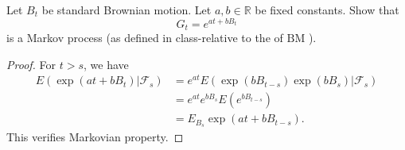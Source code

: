 \begin{problem}
	Let $B_t$ be standard Brownian motion. Let $a, b \in \mathbb{R}$ be fixed constants. Show that
\[
G_t=e^{a t+b B_t}
\]
is a Markov process (as defined in class-relative to the of $\mathrm{BM}$ ).
\end{problem}
\begin{proof}
	For $t > s$, we have
	\begin{align*}
		E\left( \exp\left( a t + b B_t \right) | \mathcal{F}_s \right) 
		&= e^{at } E\left( \exp\left( b B_{t - s} \right) \exp\left( b B_s \right) | \mathcal{F}_s \right)  \\
		&= e^{at } e^{b B_s} E\left( e^{b B_{t - s}} \right)  \\
		&= E_{B_s} \exp\left( a t + b B_{t - s} \right) 
	.\end{align*}
	This verifies Markovian property.
\end{proof}

